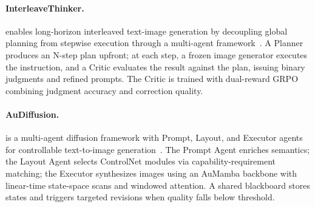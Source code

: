 \paragraph{InterleaveThinker.}
 enables long-horizon interleaved text-image generation by decoupling global planning from stepwise execution through a multi-agent framework~\cite{avg260613679}. A Planner produces an N-step plan upfront; at each step, a frozen image generator executes the instruction, and a Critic evaluates the result against the plan, issuing binary judgments and refined prompts. The Critic is trained with dual-reward GRPO combining judgment accuracy and correction quality. 

\paragraph{AuDiffusion.}
 is a multi-agent diffusion framework with Prompt, Layout, and Executor agents for controllable text-to-image generation~\cite{avgdoi101007s40747025022111}. The Prompt Agent enriches semantics; the Layout Agent selects ControlNet modules via capability-requirement matching; the Executor synthesizes images using an AuMamba backbone with linear-time state-space scans and windowed attention. A shared blackboard stores states and triggers targeted revisions when quality falls below threshold.

